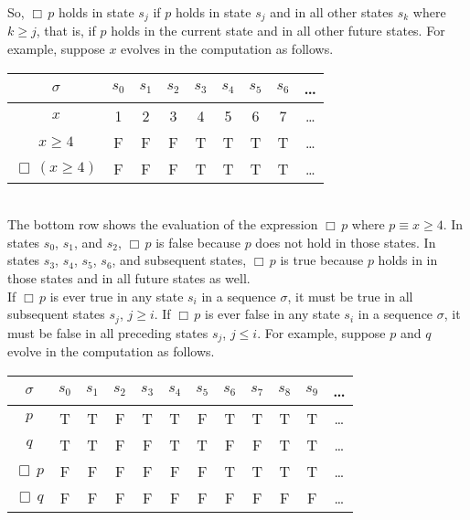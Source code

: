 \documentclass[fleqn, leqno]{article}
\newcommand{\Always}{\Box\,}
\begin{document}
So, $\Always p$ holds in state $s_j$ if $p$ holds in state $s_j$ and in all other states $s_k$ where $k\ge j$,
that is, if $p$ holds in the current state and in all other future states.
For example, suppose $x$ evolves in the computation as follows.\\

\begin{tabular}{c|cccccccc}
  $\sigma$                  & $s_0$ & $s_1$ & $s_2$ & $s_3$ & $s_4$ & $s_5$ & $s_6$ & \dots \\
  \hline
  $x$                       & 1     & 2     & 3     & 4     & 5     & 6     & 7     &  \dots\\
  $x \ge 4$                 & F     & F     & F     & T     & T     & T     & T     &  \dots\\
  $\Always(x \ge 4)$        & F     & F     & F     & T     & T     & T     & T     &  \dots\\
\end{tabular}\\

The bottom row shows the evaluation of the expression $\Always p$ where $p\equiv x \ge 4$.
In states $s_0$, $s_1$, and $s_2$, $\Always p$ is false because $p$ does not hold in those states.
In states $s_3$, $s_4$, $s_5$, $s_6$, and subsequent states, $\Always p$ is true because $p$ holds in in those states
and in all future states as well.\\

If $\Always p$ is ever true in any state $s_i$ in a sequence $\sigma$, it must be true in all subsequent states $s_j$, $j\ge i$.
If $\Always p$ is ever false in any state $s_i$ in a sequence $\sigma$, it must be false in all preceding states $s_j$, $j\le i$.
For example, suppose $p$ and $q$ evolve in the computation as follows.\\

\begin{tabular}{c|ccccccccccc}
  $\sigma$       & $s_0$ & $s_1$ & $s_2$ & $s_3$ & $s_4$ & $s_5$ & $s_6$ & $s_7$ & $s_8$& $s_9$  & \dots \\
  \hline
  $p$            & T     & T     & F     & T     & T     & F     & T     & T     & T     & T     &  \dots\\
  $q$            & T     & T     & F     & F     & T     & T     & F     & F     & T     & T     &  \dots\\
  $\Always p$    & F     & F     & F     & F     & F     & F     & T     & T     & T     & T     &  \dots\\
  $\Always q$    & F     & F     & F     & F     & F     & F     & F     & F     & F     & F     &  \dots\\
\end{tabular}\\
\end{document}
